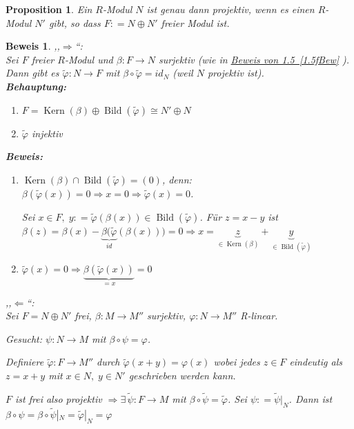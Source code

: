 \documentclass[a4paper,12pt]{scrbook}
\theoremstyle{break}
\newtheorem{Prop}[Def]{Proposition}
\theoremstyle{nonumberbreak}
\newtheorem{Bew}{Beweis}
\theoremstyle{nonumberplain}
\newcommand{\defeqr}[0]{\mathrel{\mathop:}=}
\newcommand{\myref}[2]{%
\hyperref[#2]{#1~\ref*{#2}}%
}
\DeclareMathOperator{\Kern}{Kern}
\DeclareMathOperator{\Bild}{Bild}
\begin{document}
\begin{Prop}
\label{1.6}
  Ein $R$-Modul $N$ ist genau dann projektiv, wenn es einen $R$-Modul $N'$ gibt,
  so dass $F \defeqr N \oplus N'$ freier Modul ist.
\end{Prop}

\begin{Bew}
  ,,$\Rightarrow$``:\\
  Sei $F$ freier $R$-Modul und $\beta: F \to N$ surjektiv (wie in \myref{Beweis von
  1.5}{1.5fBew}). Dann gibt es $\tilde{\varphi}: N \to F$ mit $\beta \circ
  \tilde{\varphi} = id_N$ (weil $N$ projektiv ist).\\
  \textbf{Behauptung:}
  \begin{enumerate}
    \item[1.)] $F = \Kern(\beta) \oplus \Bild(\tilde{\varphi}) \cong N' \oplus N$
    \item[2.)] $\tilde{\varphi}$ injektiv
  \end{enumerate}
  \textbf{Beweis:}
  \begin{enumerate}
    \item[1.)] $\Kern(\beta) \cap \Bild(\tilde{\varphi}) = (0)$, denn:
               $\beta(\tilde{\varphi}(x)) = 0 \Rightarrow x = 0 \Rightarrow
               \tilde{\varphi}(x) = 0$.
  
               Sei $x \in F,\; y \defeqr
               \tilde{\varphi}(\beta(x)) \in \Bild(\tilde{\varphi})$.
               Für $z = x - y$ ist $\beta(z) = \beta(x) -
               \underbrace{\beta(\tilde{\varphi}}_{id}(\beta(x)))= 0 \Rightarrow x = \underbrace{z}_{\in
               \Kern(\beta)} + \underbrace{y}_{\in \Bild(\tilde{\varphi})}$
    \item[2.)] $\tilde{\varphi}(x) = 0 \Rightarrow \underbrace{\beta(\tilde{\varphi}(x))}_{= x} = 0$
  \end{enumerate}
  ,,$\Leftarrow$``:\\
  Sei $F = N \oplus N'$ frei, $\beta: M \to M''$ surjektiv, $\varphi: N \to M''$
  R-linear.

  Gesucht: $\psi: N \to M$ mit $\beta \circ \psi = \varphi$.

  Definiere $\tilde{\varphi}: F \to M''$ durch $\tilde{\varphi}(x + y) =
  \varphi(x)$ wobei jedes $z \in F$ eindeutig als $z = x + y$ mit $x \in N,\; y
  \in N'$ geschrieben werden kann.

  $F$ ist frei also projektiv $\Rightarrow \exists\, \tilde{\psi}: F \to M$ mit
  $\beta \circ \tilde{\psi} = \tilde{\varphi}$. Sei $\psi \defeqr
  \tilde{\psi}|_N$. Dann ist $\beta \circ \psi = \beta \circ \tilde{\psi}|_N =
  \tilde{\varphi}|_N = \varphi$
\end{Bew}
\end{document}
